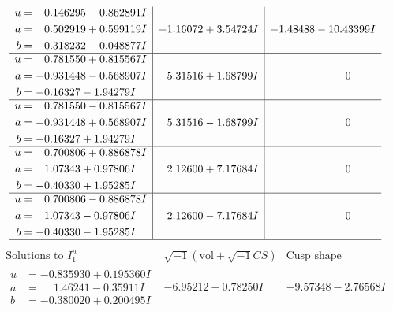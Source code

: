 \documentclass[1p]{elsarticle_modified}
\theoremstyle{definition}
\newcommand{\I}{\sqrt{-1}}
\begin{document}
$$\begin{array}{c|c|c}
\begin{aligned}
u &= \phantom{-}0.146295 - 0.862891 I \\
a &= \phantom{-}0.502919 + 0.599119 I \\
b &= \phantom{-}0.318232 - 0.048877 I\end{aligned}
 & -1.16072 + 3.54724 I & -1.48488 - 10.43399 I \\ \hline\begin{aligned}
u &= \phantom{-}0.781550 + 0.815567 I \\
a &= -0.931448 - 0.568907 I \\
b &= -0.16327 - 1.94279 I\end{aligned}
 & \phantom{-}5.31516 + 1.68799 I & \phantom{-0.000000 } 0 \\ \hline\begin{aligned}
u &= \phantom{-}0.781550 - 0.815567 I \\
a &= -0.931448 + 0.568907 I \\
b &= -0.16327 + 1.94279 I\end{aligned}
 & \phantom{-}5.31516 - 1.68799 I & \phantom{-0.000000 } 0 \\ \hline\begin{aligned}
u &= \phantom{-}0.700806 + 0.886878 I \\
a &= \phantom{-}1.07343 + 0.97806 I \\
b &= -0.40330 + 1.95285 I\end{aligned}
 & \phantom{-}2.12600 + 7.17684 I & \phantom{-0.000000 } 0 \\ \hline\begin{aligned}
u &= \phantom{-}0.700806 - 0.886878 I \\
a &= \phantom{-}1.07343 - 0.97806 I \\
b &= -0.40330 - 1.95285 I\end{aligned}
 & \phantom{-}2.12600 - 7.17684 I & \phantom{-0.000000 } 0\\
 \hline 
 \end{array}$$\newpage$$\begin{array}{c|c|c}  
\text{Solutions to }I^u_{1}& \I (\text{vol} + \sqrt{-1}CS) & \text{Cusp shape}\\
 \hline 
\begin{aligned}
u &= -0.835930 + 0.195360 I \\
a &= \phantom{-}1.46241 - 0.35911 I \\
b &= -0.380020 + 0.200495 I\end{aligned}
 & -6.95212 - 0.78250 I & -9.57348 - 2.76568 I \\ \hline\begin{aligned}

\end{aligned}
\end{array}$$
\end{document}
